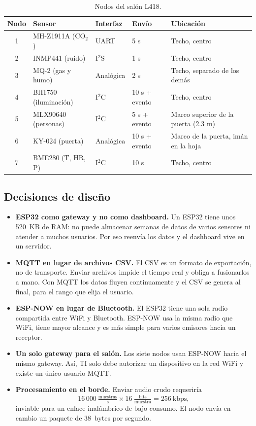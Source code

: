 \documentclass[11pt,a4paper]{article}
\begin{document}
\begin{table}[H]
\centering
\caption{Nodos del sal\'on L418.}
\small
\begin{tabularx}{\textwidth}{@{}clllX@{}}
\toprule
\textbf{Nodo} & \textbf{Sensor} & \textbf{Interfaz} & \textbf{Env\'io} & \textbf{Ubicaci\'on} \\
\midrule
1 & MH-Z1911A (CO$_2$) & UART & 5 s & Techo, centro \\
2 & INMP441 (ruido) & I$^2$S & 1 s & Techo, centro \\
3 & MQ-2 (gas y humo) & Anal\'ogica & 2 s & Techo, separado de los dem\'as \\
4 & BH1750 (iluminaci\'on) & I$^2$C & 10 s + evento & Techo, centro \\
5 & MLX90640 (personas) & I$^2$C & 5 s + evento & Marco superior de la puerta (2.3 m) \\
6 & KY-024 (puerta) & Anal\'ogica & 10 s + evento & Marco de la puerta, im\'an en la hoja \\
7 & BME280 (T, HR, P) & I$^2$C & 10 s & Techo, centro \\
\bottomrule
\end{tabularx}
\end{table}

\subsection{Decisiones de dise\~no}

\begin{itemize}
  \item \textbf{ESP32 como gateway y no como dashboard.} Un ESP32 tiene unos 520~KB de RAM:
        no puede almacenar semanas de datos de varios sensores ni atender a muchos usuarios.
        Por eso reenv\'ia los datos y el dashboard vive en un servidor.
  \item \textbf{MQTT en lugar de archivos CSV.} El CSV es un formato de exportaci\'on, no de
        transporte. Enviar archivos impide el tiempo real y obliga a fusionarlos a mano. Con
        MQTT los datos fluyen continuamente y el CSV se genera al final, para el rango que
        elija el usuario.
  \item \textbf{ESP-NOW en lugar de Bluetooth.} El ESP32 tiene una sola radio compartida
        entre WiFi y Bluetooth. ESP-NOW usa la misma radio que WiFi, tiene mayor alcance y
        es m\'as simple para varios emisores hacia un receptor.
  \item \textbf{Un solo gateway para el sal\'on.} Los siete nodos usan ESP-NOW hacia el
        mismo gateway. As\'i, TI solo debe autorizar un dispositivo en la red WiFi y
        existe un \'unico usuario MQTT.
  \item \textbf{Procesamiento en el borde.} Enviar audio crudo requerir\'ia
  \begin{equation}
    16\,000~\tfrac{\text{muestras}}{\text{s}} \times 16~\tfrac{\text{bits}}{\text{muestra}}
    = 256~\text{kbps},
  \end{equation}
  inviable para un enlace inal\'ambrico de bajo consumo. El nodo env\'ia en cambio un
  paquete de 38~bytes por segundo.
\end{itemize}
\end{document}
